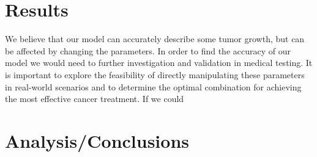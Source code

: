 \documentclass[11pt]{amsart}
\begin{document}
\section{Results}

 We believe that our model can accurately describe some tumor growth, but can be affected by changing the parameters. In order to find the accuracy of our model we would need to further investigation and validation in medical testing. It is important to explore the feasibility of directly manipulating these parameters in real-world scenarios and to determine the optimal combination for achieving the most effective cancer treatment. If we could 

\section{Analysis/Conclusions}







\FloatBarrier %
\newpage

{} %

\end{document}
